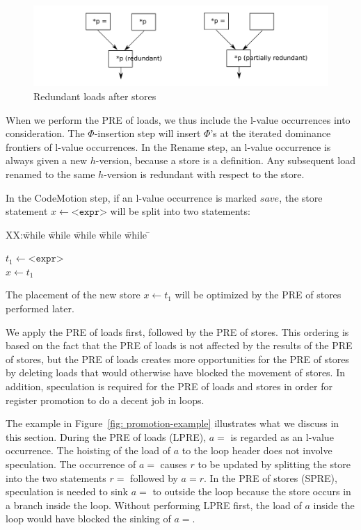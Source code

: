 \begin{figure}
\centering
\includegraphics[scale=0.55]{fig-lval-occur}
\caption{Redundant loads after stores}
\label{fig: lval-occur}
\end{figure}

When we perform the PRE of loads, we thus include the l-value occurrences into
consideration.  The $\Phi$-insertion step will insert $\Phi$'s at the iterated
dominance frontiers of l-value occurrences.  In the Rename step, an l-value
occurrence is always given a new $h$-version, because a store is a definition.
Any subsequent load renamed to the same $h$-version is redundant with respect
to the store.

In the CodeMotion step, if an l-value occurrence is marked $save$, the
store statement $x \leftarrow \texttt{<expr>}$ will be split into two 
statements:
\begin{tabbing}
XX:\= while \= while \= while \= while \= while \= \kill

\> \> $t_1 \leftarrow \texttt{<expr>}$ \\
\> \> $x \leftarrow t_1$ \\
\end{tabbing}
The placement of the new store $x \leftarrow t_1$ will be optimized by the PRE
of stores performed later.

We apply the PRE of loads
first, followed by the PRE of stores.  This ordering is based on the fact that
the PRE of loads is not affected by the results of the PRE of stores, but the
PRE of loads creates more opportunities for the PRE of stores by deleting
loads that would otherwise have blocked the movement of stores.  In addition,
speculation is required for the PRE of loads and stores in order for register
promotion to do a decent job in loops.  

The example in Figure~\ref{fig: promotion-example} illustrates what we discuss
in this section.  During the PRE of loads (LPRE), $a =$ is regarded as an
l-value occurrence.  The hoisting of the load of $a$ to the loop header does
not involve speculation. The occurrence of $a =$ causes $r$ to be updated
by splitting the store into the two statements $r =$ followed by $a = r$.  In 
the PRE of stores (SPRE), speculation is needed to sink $a =$ to outside the
loop because the store occurs in a branch inside the loop.  Without performing 
LPRE first, the load of $a$ inside the loop would
have blocked the sinking of $a =$.

